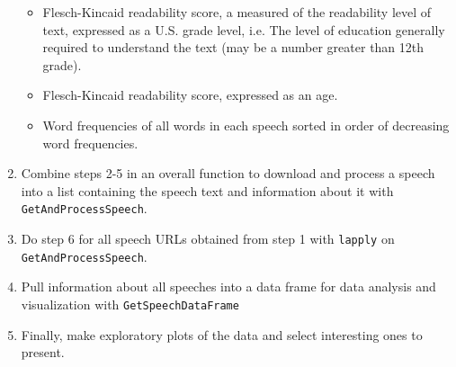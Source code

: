\documentclass{article}\usepackage[]{graphicx}\usepackage[]{color}
\begin{document}
\begin{enumerate}
\begin{itemize}
  \item Flesch-Kincaid readability score, a measured of the readability level of text, expressed as a U.S. grade level, i.e. The level of education generally required to understand the text (may be a number greater than 12th grade).
  \item Flesch-Kincaid readability score, expressed as an age.
  \item Word frequencies of all words in each speech sorted in order of decreasing word frequencies.
  \end{itemize}
\item Combine steps 2-5 in an overall function to download and process a speech into a list containing the speech text and information about it with \texttt{GetAndProcessSpeech}.
\item Do step 6 for all speech URLs obtained from step 1 with \texttt{lapply} on \texttt{GetAndProcessSpeech}.
\item Pull information about all speeches into a data frame for data analysis and visualization 
with \texttt{GetSpeechDataFrame}
\item Finally, make exploratory plots of the data and select interesting ones to present.
\end{enumerate}
\end{document}
